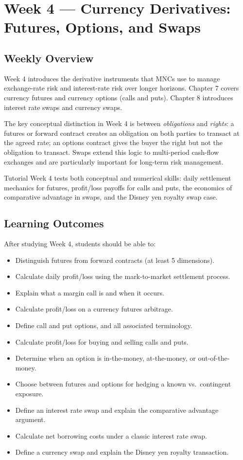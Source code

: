 \documentclass[11pt,a4paper]{article}
\begin{document}
\newpage

\section{Week 4 — Currency Derivatives: Futures, Options, and Swaps}

\subsection{Weekly Overview}

Week 4 introduces the derivative instruments that MNCs use to manage exchange-rate risk and interest-rate risk over longer horizons. Chapter 7 covers currency futures and currency options (calls and puts). Chapter 8 introduces interest rate swaps and currency swaps.

The key conceptual distinction in Week 4 is between \textit{obligations} and \textit{rights}: a futures or forward contract creates an obligation on both parties to transact at the agreed rate; an options contract gives the buyer the right but not the obligation to transact. Swaps extend this logic to multi-period cash-flow exchanges and are particularly important for long-term risk management.

Tutorial Week 4 tests both conceptual and numerical skills: daily settlement mechanics for futures, profit/loss payoffs for calls and puts, the economics of comparative advantage in swaps, and the Disney yen royalty swap case.

\subsection{Learning Outcomes}

After studying Week 4, students should be able to:
\begin{itemize}
  \item Distinguish futures from forward contracts (at least 5 dimensions).
  \item Calculate daily profit/loss using the mark-to-market settlement process.
  \item Explain what a margin call is and when it occurs.
  \item Calculate profit/loss on a currency futures arbitrage.
  \item Define call and put options, and all associated terminology.
  \item Calculate profit/loss for buying and selling calls and puts.
  \item Determine when an option is in-the-money, at-the-money, or out-of-the-money.
  \item Choose between futures and options for hedging a known vs.\ contingent exposure.
  \item Define an interest rate swap and explain the comparative advantage argument.
  \item Calculate net borrowing costs under a classic interest rate swap.
  \item Define a currency swap and explain the Disney yen royalty transaction.
\end{itemize}
\end{document}
